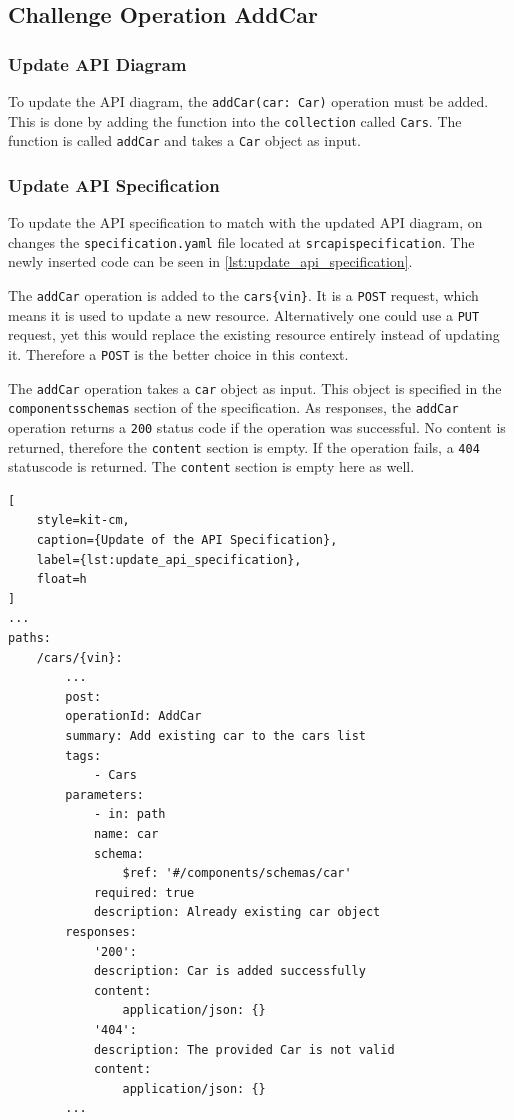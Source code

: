 \subsection{Challenge Operation AddCar}
\subsubsection*{Update API Diagram}
To update the API diagram, the \texttt{addCar(car: Car)} operation must be added.
This is done by adding the function into the \texttt{collection} called \texttt{Cars}.
The function is called \texttt{addCar} and takes a \texttt{Car} object as input.

\subsubsection*{Update API Specification}
To update the API specification to match with the updated API diagram, on changes the \texttt{specification.yaml} file located at \texttt{src\/api\/specification\/}.
The newly inserted code can be seen in \autoref{lst:update_api_specification}.

The \texttt{addCar} operation is added to the \texttt{cars\/\{vin\}}.
It is a \texttt{POST} request, which means it is used to update a new resource.
Alternatively one could use a \texttt{PUT} request, yet this would replace the existing resource entirely instead of updating it.
Therefore a \texttt{POST} is the better choice in this context.

The \texttt{addCar} operation takes a \texttt{car} object as input.
This object is specified in the \texttt{components\/schemas} section of the specification.
As responses, the \texttt{addCar} operation returns a \texttt{200} status code if the operation was successful.
No content is returned, therefore the \texttt{content} section is empty.
If the operation fails, a \texttt{404} statuscode is returned.
The \texttt{content} section is empty here as well.

\begin{lstlisting}[
    style=kit-cm,
    caption={Update of the API Specification},
    label={lst:update_api_specification},
    float=h
]
...
paths:
    /cars/{vin}:
        ...
        post:
        operationId: AddCar
        summary: Add existing car to the cars list
        tags:
            - Cars
        parameters:
            - in: path
            name: car
            schema:
                $ref: '#/components/schemas/car'
            required: true
            description: Already existing car object
        responses:
            '200':
            description: Car is added successfully
            content:
                application/json: {}
            '404':
            description: The provided Car is not valid
            content:
                application/json: {}
        ...
\end{lstlisting}
